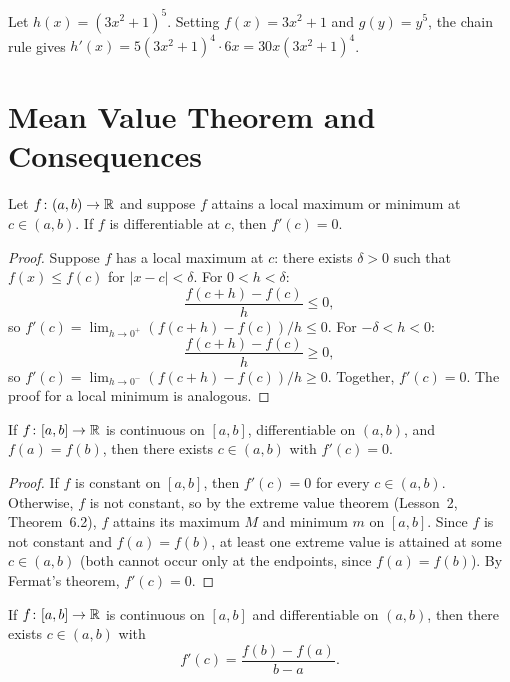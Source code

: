\documentclass[11pt,a4paper]{article}
\begin{document}
\begin{example}
\label{ex:chain_rule}
Let $h(x) = (3x^2 + 1)^5$. Setting $f(x) = 3x^2 + 1$ and $g(y) = y^5$,
the chain rule gives $h'(x) = 5(3x^2+1)^4 \cdot 6x = 30x(3x^2+1)^4$.
\end{example}

\section{Mean Value Theorem and Consequences}
\label{sec:mvt}

\begin{theorem}
\label{thm:fermat}
Let $f \colon (a, b) \to \mathbb{R}$ and suppose $f$ attains a local maximum or
minimum at $c \in (a, b)$. If $f$ is differentiable at $c$, then
$f'(c) = 0$.
\end{theorem}

\begin{proof}
Suppose $f$ has a local maximum at $c$: there exists $\delta > 0$ such
that $f(x) \le f(c)$ for $|x - c| < \delta$. For $0 < h < \delta$:
\[
  \frac{f(c + h) - f(c)}{h} \le 0,
\]
so $f'(c) = \lim_{h \to 0^+} (f(c+h) - f(c))/h \le 0$. For
$-\delta < h < 0$:
\[
  \frac{f(c + h) - f(c)}{h} \ge 0,
\]
so $f'(c) = \lim_{h \to 0^-} (f(c+h) - f(c))/h \ge 0$. Together,
$f'(c) = 0$. The proof for a local minimum is analogous.
\end{proof}

\begin{theorem}
\label{thm:rolle}
If $f \colon [a, b] \to \mathbb{R}$ is continuous on $[a, b]$, differentiable on
$(a, b)$, and $f(a) = f(b)$, then there exists $c \in (a, b)$ with
$f'(c) = 0$.
\end{theorem}

\begin{proof}
If $f$ is constant on $[a, b]$, then $f'(c) = 0$ for every
$c \in (a, b)$. Otherwise, $f$ is not constant, so by the extreme value
theorem (Lesson~2, Theorem~6.2), $f$ attains its maximum $M$ and minimum
$m$ on $[a, b]$. Since $f$ is not constant and $f(a) = f(b)$, at least
one extreme value is attained at some $c \in (a, b)$ (both cannot occur
only at the endpoints, since $f(a) = f(b)$). By Fermat's theorem,
$f'(c) = 0$.
\end{proof}

\begin{keyresult}[title={Mean Value Theorem}]
\begin{theorem}
\label{thm:mvt}
If $f \colon [a, b] \to \mathbb{R}$ is continuous on $[a, b]$ and differentiable
on $(a, b)$, then there exists $c \in (a, b)$ with
\[
  f'(c) = \frac{f(b) - f(a)}{b - a}.
\]
\end{theorem}
\end{keyresult}
\end{document}
